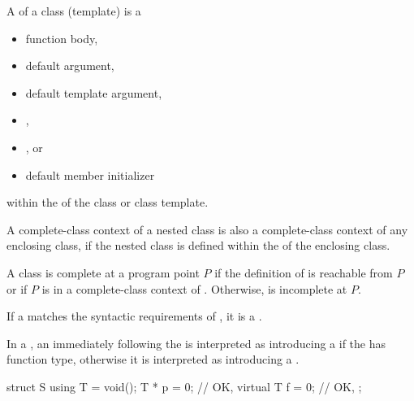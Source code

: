 \pnum
{}%
A  of a class (template) is a
\begin{itemize}
\item function body,
\item default argument,
\item default template argument,
\item {},
\item {}, or
\item default member initializer
\end{itemize}
within the  of the class or class template.
\begin{note}
A complete-class context of a nested class is also a complete-class
context of any enclosing class, if the nested class is defined within
the  of the enclosing class.
\end{note}

\pnum
A class  is complete at a program point $P$
if the definition of  is reachable from $P$
or if $P$ is in a complete-class context of .
Otherwise,  is incomplete at $P$.

\pnum
If a  matches
the syntactic requirements of ,
it is a .

\pnum
In a ,
an \tcode{=} immediately following the 
is interpreted as introducing a 
if the  has function type,
otherwise it is interpreted as introducing
a .
\begin{example}
\begin{codeblock}
struct S {
  using T = void();
  T * p = 0;        // OK, 
  virtual T f = 0;  // OK, 
};
\end{codeblock}
\end{example}

